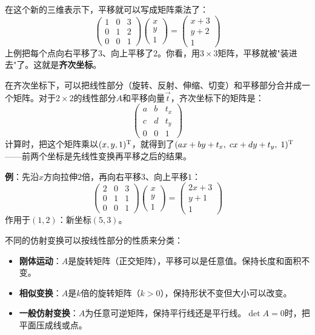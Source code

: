 \documentclass[a4paper,12pt]{ctexart}
\begin{document}
在这个新的三维表示下，平移就可以写成矩阵乘法了：
\[
\begin{pmatrix}1&0&3\\0&1&2\\0&0&1\end{pmatrix}
\begin{pmatrix}x\\y\\1\end{pmatrix}=
\begin{pmatrix}x+3\\y+2\\1\end{pmatrix}
\]
上例把每个点向右平移了$3$、向上平移了$2$。你看，用$3\times3$矩阵，平移就被"装进去"了。这就是\textbf{齐次坐标}。


在齐次坐标下，可以把线性部分（旋转、反射、伸缩、切变）和平移部分合并成一个矩阵。对于$2\times2$的线性部分$A$和平移向量$\vec t$，齐次坐标下的矩阵是：
\[
\begin{pmatrix}
a&b&t_x\\
c&d&t_y\\
0&0&1
\end{pmatrix}
\]
计算时，把这个矩阵乘以$(x,y,1)^\text T$，就得到了$(ax+by+t_x,\;cx+dy+t_y,\;1)^\text T$——前两个坐标是先线性变换再平移之后的结果。

\textbf{例}：先沿$x$方向拉伸$2$倍，再向右平移$3$、向上平移$1$：
\[
\begin{pmatrix}2&0&3\\0&1&1\\0&0&1\end{pmatrix}
\begin{pmatrix}x\\y\\1\end{pmatrix}=
\begin{pmatrix}2x+3\\y+1\\1\end{pmatrix}
\]
作用于$(1,2)$：新坐标$(5,3)$。


不同的仿射变换可以按线性部分的性质来分类：
\begin{itemize}
\item \textbf{刚体运动}：$A$是旋转矩阵（正交矩阵），平移可以是任意值。保持长度和面积不变。
\item \textbf{相似变换}：$A$是$k$倍的旋转矩阵（$k>0$），保持形状不变但大小可以改变。
\item \textbf{一般仿射变换}：$A$为任意可逆矩阵，保持平行线还是平行线。$\det A=0$时，把平面压成线或点。
\end{itemize}
\end{document}
